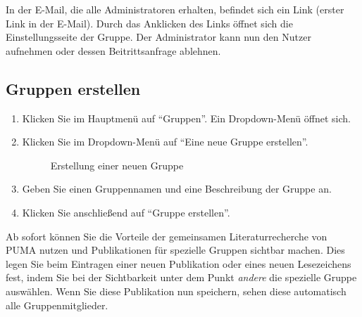 In der E-Mail, die alle Administratoren erhalten, befindet sich ein Link (erster Link in der E-Mail). Durch das Anklicken des Links öffnet sich die Einstellungsseite der Gruppe. Der Administrator kann nun den Nutzer aufnehmen oder dessen Beitrittsanfrage ablehnen.
\subsection{Gruppen erstellen}
\label{subsec:gruppenErstellen}
\begin{enumerate}
    \item Klicken Sie im Hauptmenü auf \enquote{Gruppen}. Ein Dropdown-Menü öffnet sich.
    \item Klicken Sie im Dropdown-Menü auf \enquote{Eine neue Gruppe erstellen}.
\begin{figure}[h!]
 \centering
 \caption{Erstellung einer neuen Gruppe}
 \label{fig:erstellungNeueGruppe}
\end{figure}
    \item Geben Sie einen Gruppennamen und eine Beschreibung der Gruppe an. 
    \item Klicken Sie anschließend auf \enquote{Gruppe erstellen}. 
\end{enumerate}
Ab sofort können Sie die Vorteile der gemeinsamen Literaturrecherche von PUMA nutzen und Publikationen für spezielle Gruppen sichtbar machen. Dies legen Sie beim Eintragen einer neuen Publikation oder eines neuen Lesezeichens fest, indem Sie bei der Sichtbarkeit unter dem Punkt \textit{andere} die spezielle Gruppe auswählen. Wenn Sie diese Publikation nun speichern, sehen diese automatisch alle Gruppenmitglieder.
